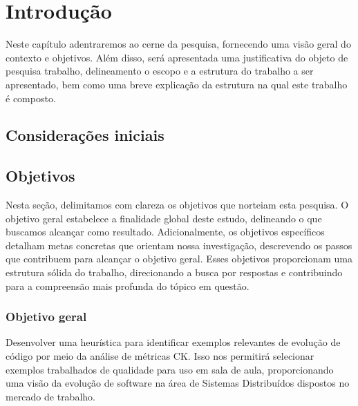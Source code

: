 
\chapter{Introdução}\label{cap:introducao}

Neste capítulo adentraremos ao cerne da pesquisa, fornecendo uma visão geral do contexto e objetivos. Além disso, será apresentada uma justificativa do objeto de pesquisa trabalho, delineamento o escopo e a estrutura do trabalho a ser apresentado, bem como uma breve explicação da estrutura na qual este trabalho é composto. 

\section{Considerações iniciais}\label{sec:consideracoesIniciais}

\section{Objetivos}\label{sec:objetivos}

Nesta seção, delimitamos com clareza os objetivos que norteiam esta pesquisa. O objetivo geral estabelece a finalidade global deste estudo, delineando o que buscamos alcançar como resultado. Adicionalmente, os objetivos específicos detalham metas concretas que orientam nossa investigação, descrevendo os passos que contribuem para alcançar o objetivo geral. Esses objetivos proporcionam uma estrutura sólida do trabalho, direcionando a busca por respostas e contribuindo para a compreensão mais profunda do tópico em questão.

\subsection{Objetivo geral}\label{subsec:objetivoGeral}

Desenvolver uma heurística para identificar exemplos relevantes de evolução de código por meio da análise de métricas CK. Isso nos permitirá selecionar exemplos trabalhados de qualidade para uso em sala de aula, proporcionando uma visão da evolução de software na área de Sistemas Distribuídos dispostos no mercado de trabalho.

